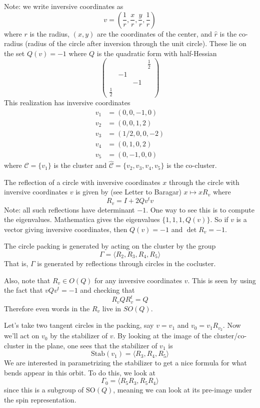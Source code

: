 \documentclass[]{article}
\begin{document}
Note: we write inversive coordinates as
$$
v = \left( \frac{1}{r}, \frac{x}{r}, \frac{y}{r}, \frac{1}{\hat{r}} \right)
$$
where $r$ is the radius, $(x, y)$ are the coordinates of the center, and $\hat{r}$ is the co-radius (radius of the circle after inversion through the unit circle).
These lie on the set $Q(v) = -1$ where $Q$ is the quadratic form with half-Hessian
$$
\begin{pmatrix}
~ & ~ & ~ & \frac{1}{2} \\
~ & -1 & ~ & ~ \\
~ & ~ & -1 & ~ \\
\frac{1}{2} & ~ & ~ & ~
\end{pmatrix}
$$
This realization has inversive coordinates
\begin{align*}
v_1 &= (0, 0, -1, 0) \\
v_2 &= (0, 0, 1, 2) \\
v_3 &= (1/2, 0, 0, -2) \\
v_4 &= (0, 1, 0, 2) \\
v_5 &= (0, -1, 0, 0)
\end{align*}
where $\mathcal{C} = \{v_1\}$ is the cluster and $\hat{\mathcal{C}} = \{v_2, v_3, v_4, v_5\}$ is the co-cluster.

The reflection of a circle with inversive coordinates $x$ through the circle with inversive coordinates $v$ is given by (see Letter to Baragar) $x \mapsto xR_v$ where
$$
R_v = I + 2Qv^tv
$$
Note: all such reflections have determinant $-1$.
One way to see this is to compute the eigenvalues.
Mathematica gives the eigenvalues $\{1, 1, 1, Q(v)\}$.
So if $v$ is a vector giving inversive coordinates, then $Q(v) = -1$ and $\det R_v = -1$.

The circle packing is generated by acting on the cluster by the group
$$
\Gamma = \langle R_2, R_3, R_4, R_5 \rangle
$$
That is, $\Gamma$ is generated by reflections through circles in the cocluster.

Also, note that $R_v \in O(Q)$ for any inversive coordinates $v$.
This is seen by using the fact that $vQv^t = -1$ and checking that
$$
R_vQR_v^t = Q
$$
Therefore even words in the $R_v$ live in $SO(Q)$.

Let's take two tangent circles in the packing, say $v = v_1$ and $v_0 = v_1R_{v_2}$.
Now we'll act on $v_0$ by the stabilizer of $v$. By looking at the image of the cluster/co-cluster in the plane, one sees that the stabilizer of $v_1$ is
$$
\text{Stab}(v_1) = \langle R_3, R_4, R_5 \rangle
$$
We are interested in parametrizing the stabilizer to get a nice formula for what bends appear in this orbit.
To do this, we look at
$$
\Gamma_0 = \langle R_5R_3, R_5R_4 \rangle
$$
since this is a subgroup of $\text{SO}(Q)$, meaning we can look at its pre-image under the spin representation.
\end{document}
